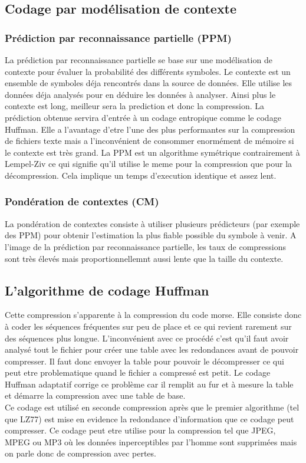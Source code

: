 \documentclass[a4paper]{report}
\begin{document}
	\subsection{Codage par modélisation de contexte}
	\subsubsection{Prédiction par reconnaissance partielle (PPM)}
		La prédiction par reconnaissance partielle se base sur une modélisation de contexte pour évaluer la probabilité des différents symboles. Le contexte est un ensemble de symboles déja rencontrés dans la source de données. Elle utilise les données déja analysés pour en déduire les données à analyser. Ainsi plus le contexte est long, meilleur sera la prediction et donc la compression. La prédiction obtenue servira d'entrée à un codage entropique comme le codage Huffman. Elle a l'avantage d'etre l'une des plus performantes sur la compression de fichiers texte mais a l'inconvénient de consommer enormément de mémoire si le contexte est très grand. La PPM est un algorithme symétrique contrairement à Lempel-Ziv ce qui signifie qu'il utilise le meme pour la compression que pour la décompression. Cela implique un temps d'execution identique et assez lent.
	\subsubsection{Pondération de contextes (CM)}
		La pondération de contextes consiste à utiliser plusieurs prédicteurs (par exemple des PPM) pour obtenir l'estimation la plus fiable possible du symbole à venir. A l'image de la prédiction par reconnaissance partielle, les taux de compressions sont très élevés mais proportionnellemnt aussi lente que la taille du contexte.
	\subsection{L'algorithme de codage Huffman}
		Cette compression s'apparente à la compression du code morse. Elle consiste donc à coder les séquences fréquentes sur peu de place et ce qui revient rarement sur des séquences plus longue. L'inconvénient avec ce procédé c'est qu'il faut avoir analysé tout le fichier pour créer une table avec les redondances avant de pouvoir compresser. Il faut donc envoyer la table pour pouvoir le décompresser ce qui peut etre problematique quand le fichier a compressé est petit. Le codage Huffman adaptatif corrige ce problème car il remplit au fur et à mesure la table et démarre la compression avec une table de base. \\
	Ce codage est utilisé en seconde compression après que le premier algorithme (tel que LZ77) est mise en evidence la redondance d'information que ce codage peut compresser. Ce codage peut etre utilise pour la compression tel que JPEG, MPEG ou MP3 où les données inperceptibles par l'homme sont supprimées mais on parle donc de compression avec pertes.
\end{document}
